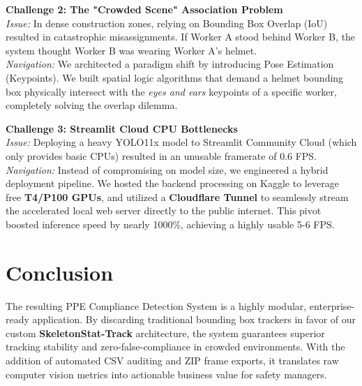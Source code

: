 \documentclass[12pt,a4paper]{article}
\begin{document}
\textbf{Challenge 2: The "Crowded Scene" Association Problem}\\
\textit{Issue:} In dense construction zones, relying on Bounding Box Overlap (IoU) resulted in catastrophic misassignments. If Worker A stood behind Worker B, the system thought Worker B was wearing Worker A's helmet.\\
\textit{Navigation:} We architected a paradigm shift by introducing Pose Estimation (Keypoints). We built spatial logic algorithms that demand a helmet bounding box physically intersect with the \textit{eyes and ears} keypoints of a specific worker, completely solving the overlap dilemma.

\textbf{Challenge 3: Streamlit Cloud CPU Bottlenecks}\\
\textit{Issue:} Deploying a heavy YOLO11x model to Streamlit Community Cloud (which only provides basic CPUs) resulted in an unusable framerate of 0.6 FPS.\\
\textit{Navigation:} Instead of compromising on model size, we engineered a hybrid deployment pipeline. We hosted the backend processing on Kaggle to leverage free \textbf{T4/P100 GPUs}, and utilized a \textbf{Cloudflare Tunnel} to seamlessly stream the accelerated local web server directly to the public internet. This pivot boosted inference speed by nearly 1000\%, achieving a highly usable 5-6 FPS.

\section{Conclusion}

The resulting PPE Compliance Detection System is a highly modular, enterprise-ready application. By discarding traditional bounding box trackers in favor of our custom \textbf{SkeletonStat-Track} architecture, the system guarantees superior tracking stability and zero-false-compliance in crowded environments. With the addition of automated CSV auditing and ZIP frame exports, it translates raw computer vision metrics into actionable business value for safety managers.
\end{document}
